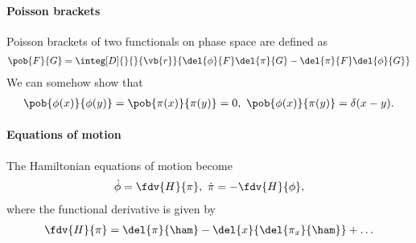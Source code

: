 \paragraph{Poisson brackets}
Poisson brackets of two functionals on phase space are defined as
\begin{align*}
	\pob{F}{G} = \integ[D]{}{}{\vb{r}}{\del{\phi}{F}\del{\pi}{G} - \del{\pi}{F}\del{\phi}{G}}
\end{align*}
We can somehow show that
\begin{align*}
	\pob{\phi(x)}{\phi(y)} = \pob{\pi(x)}{\pi(y)} = 0,\ \pob{\phi(x)}{\pi(y)} = \delta(x - y).
\end{align*}

\paragraph{Equations of motion}
The Hamiltonian equations of motion become
\begin{align*}
	\dot{\phi} = \fdv{H}{\pi},\ \dot{\pi} = -\fdv{H}{\phi},
\end{align*}
where the functional derivative is given by
\begin{align*}
	\fdv{H}{\pi} = \del{\pi}{\ham} - \del{x}{\del{\pi_{x}}{\ham}} + \dots
\end{align*}
